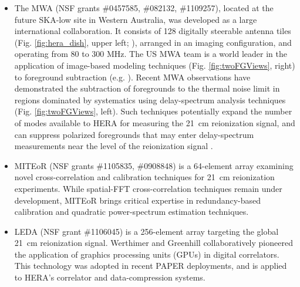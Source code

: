 \documentclass[preprint]{aastex}
\newcommand{\Mycitep}[1]{{\bf \citep{#1}}}
\newcommand{\Mycitealt}[1]{{\bf \citealt{#1}}}
\begin{document}
\begin{itemize}[noitemsep,nolistsep]
\item{The MWA} (NSF grants \#0457585, \#082132, \#1109257), 
located at the future SKA-low site
in Western Australia, was developed as a large international collaboration.  It consists
of 128 digitally steerable antenna tiles (Fig. \ref{fig:hera_dish}, upper left;
\Mycitealt{tingay_et_al2013}), arranged in an imaging configuration, and operating from 80 to 300 MHz.
The US MWA team is a world leader in the application of image-based modeling techniques 
(Fig. \ref{fig:twoFGViews}, right) to
foreground subtraction (e.g. \Mycitealt{hazelton_et_al2013,morales_et_al2006a}). %
Recent MWA observations have
demonstrated the subtraction of foregrounds to the thermal noise limit in regions dominated by systematics using
delay-spectrum analysis techniques (Fig. \ref{fig:twoFGViews}, left).
Such techniques potentially
expand the number of modes available to HERA for measuring the 21~cm reionization signal,
and can suppress polarized foregrounds that may enter delay-spectrum measurements near
the level of the reionization signal \Mycitep{moore_et_al2013}. 

\item{MITEoR} (NSF grants \#1105835, \#0908848) is a 64-element array 
examining novel cross-correlation and calibration techniques for 21~cm reionization experiments.
While spatial-FFT cross-correlation
techniques remain under development, MITEoR brings critical expertise in redundancy-based calibration
and quadratic power-spectrum estimation techniques.

\item{LEDA} (NSF grant \#1106045) is a 256-element array targeting the
global 21~cm reionization signal.  Werthimer and Greenhill collaboratively 
pioneered the application of graphics processing units (GPUs) in digital correlators.
This technology was adopted in recent PAPER deployments, and is applied to HERA's correlator
and data-compression systems.

\end{itemize}
\end{document}
